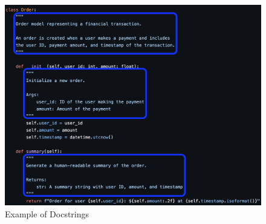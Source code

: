 \begin{figure}
    \centering
    \includegraphics[width=0.8\linewidth]{imgs/png/docstrings.png}
    \caption{Example of Docstrings}
    \label{fig:ex_docstrings}
\end{figure}
